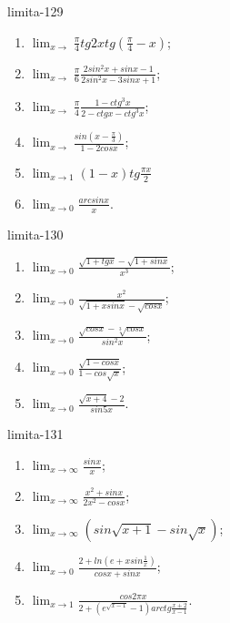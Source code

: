 \begin{defproblem}{limita-129}
\begin{multicols}{2}
\begin{enumerate}
    \item $\lim_{{x \rightarrow}} \frac{\pi}{4} tg 2x tg(\frac{\pi}{4}-x)$;
    \item $\lim_{{x \rightarrow}} \frac{\pi}{6} \frac{2 sin^2 x +sin x -1}{2 sin^2 x - 3 sin x + 1}$;
    \item $\lim_{{x \rightarrow}} \frac{\pi}{4}  \frac{1-ctg^3 x}{2- ctg x - ctg^3 x}$;
    \item $\lim_{{x \rightarrow}} \frac{sin(x-\frac{\pi}{3})}{1-2cos x}$;
    \item $\lim_{{x \rightarrow 1}} (1-x) tg \frac{\pi x}{2}$
    \item $\lim_{x \rightarrow 0} \frac{arcsin x}{x}$.
\end{enumerate}
\end{multicols}
\end{defproblem}

\begin{defproblem}{limita-130}
\begin{multicols}{2}
\begin{enumerate}
    \item $\lim_{{x \rightarrow 0}} \frac{\sqrt{1+tg x}-\sqrt{1+sin x}}{x^3}$;
    \item $\lim_{{x \rightarrow 0}} \frac{x^2}{\sqrt{1+x sin x}-\sqrt{cos x}}$;
    \item $\lim_{{x \rightarrow 0}} \frac{\sqrt{cos x}-\sqrt[3]{cos x}}{sin^2 x}$;
    \item $\lim_{{x \rightarrow 0}} \frac{\sqrt{1-cos x}}{1-cos \sqrt{x}}$;
    \item $\lim_{{x \rightarrow 0}} \frac{\sqrt{x+4}-2}{sin 5x}$.
\end{enumerate}
\end{multicols}
\end{defproblem}

\begin{defproblem}{limita-131}
\begin{multicols}{2}
\begin{enumerate}
    \item $\lim_{{x \rightarrow \infty}} \frac{sin x}{x}$;
    \item $\lim_{{x \rightarrow \infty}} \frac{x^2+sin x}{2x^2-cos x}$;
    \item $\lim_{{x \rightarrow \infty}} (sin \sqrt{x+1}-sin \sqrt{x})$;
    \item $\lim_{{x \rightarrow 0}} \frac{2+ln (e+x sin \frac{1}{x})}{cos x + sin x}$;
    \item $\lim_{{x \rightarrow 1}} \frac{cos 2\pi x}{2+(e^{\sqrt{x-1}}-1)arctg \frac{x+2}{x-1}}$.
\end{enumerate}
\end{multicols}
\end{defproblem}

